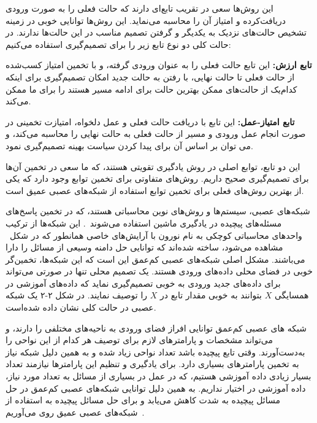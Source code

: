 این روش‌ها سعی در تقریب تابع‌ای دارند که حالت فعلی را به صورت ورودی دریافت‌کرده و امتیاز آن را محاسبه می‌نماید. این روش‌ها توانایی خوبی در زمینه تشخیص حالت‌های نزدیک به یکدیگر و گرفتن تصمیم مناسب در این حالت‌ها ندارند. در حالت کلی دو نوع تابع زیر را برای تصمیم‌گیری استفاده می‌کنیم:



 \textbf{تابع ارزش:}
این تابع حالت فعلی را به عنوان ورودی گرفته، و با تخمین امتیاز کسب‌شده از حالت فعلی تا حالت نهایی، با رفتن به حالت جدید امکان تصمیم‌گیری برای اینکه کدام‌یک از حالت‌های ممکن بهترین حالت برای ادامه مسیر هستند را برای ما ممکن می‌کند.

 \textbf{تابع امتیاز-عمل:}
این تابع با دریافت حالت فعلی و عمل دلخواه، امتیازت تخمینی در صورت انجام عمل ورودی و مسیر از حالت فعلی به حالت نهایی را محاسبه می‌کند، و می توان بر اساس آن برای پیدا کردن سیاست بهینه تصمیم‌گیری نمود.


این دو تابع، توابع اصلی در روش یادگیری تقویتی هستند، که ما سعی در تخمین آن‌ها برای تصمیم‌گیری صحیح داریم. روش‌های متفاوتی برای تخمین توابع وجود دارد که یکی از بهترین روش‌های فعلی برای تخمین توابع استفاده از شبکه‌های عصبی عمیق است.



شبکه‌های عصبی، سیستم‌ها و روش‌های نوین محاسباتی هستند، که در تخمین پاسخ‌های مسئله‌های پیچیده در یادگیری ماشین استفاده می‌شوند~\cite{lecun2015deep}. این شبکه‌ها از ترکیب واحدهای محاسباتی کوچکی به نام نورون با آرایش‌های خاصی همانطور که در شکل~ مشاهده می‌شود، ساخته شده‌اند که توانایی حل دامنه وسیعی از مسائل را دارا می‌باشند. مشکل اصلی شبکه‌های عصبی کم‌عمق این است که این شبکه‌ها، تخمین‌گر خوبی در فضای محلی داده‌های ورودی هستند. یک تصمیم محلی تنها در صورتی می‌تواند برای داده‌های جدید ورودی به خوبی تصمیم‌گیری نماید که داده‌های آموزشی در همسایگی $X$ بتوانند به خوبی مقدار تابع در $X$ را توصیف نمایند. در شکل ۲-۲ یک شبکه عصبی در حالت کلی نشان داده شده‌است. 






شبکه های عصبی کم‌عمق توانایی افراز فضای ورودی به ناحیه‌های مختلفی را دارند، و می‌تواند مشخصات و پارامترهای لازم برای توصیف هر کدام از این نواحی را به‌دست‌آورند. وقتی تابع پیچیده باشد تعداد نواحی زیاد شده و به همین دلیل شبکه نیاز به تخمین پارامترهای بسیاری دارد. برای یادگیری و تنظیم این پارامترها نیازمند تعداد بسیار زیادی داده آموزشی هستیم، که در عمل در بسیاری از مسائل به تعداد مورد نیاز، داده آموزشی در اختیار نداریم. به همین دلیل توانایی شبکه‌های عصبی کم‌عمق در حل مسائل پیچیده به شدت کاهش می‌یابد و برای حل مسائل پیچیده به استفاده از شبکه‌های عصبی عمیق روی می‌آوریم~\cite{schmidhuber2015deep}. 

